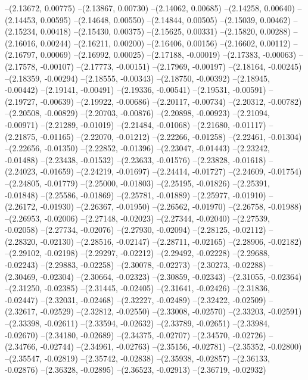 --(2.13672, 0.00775)
--(2.13867, 0.00730)
--(2.14062, 0.00685)
--(2.14258, 0.00640)
--(2.14453, 0.00595)
--(2.14648, 0.00550)
--(2.14844, 0.00505)
--(2.15039, 0.00462)
--(2.15234, 0.00418)
--(2.15430, 0.00375)
--(2.15625, 0.00331)
--(2.15820, 0.00288)
--(2.16016, 0.00244)
--(2.16211, 0.00200)
--(2.16406, 0.00156)
--(2.16602, 0.00112)
--(2.16797, 0.00069)
--(2.16992, 0.00025)
--(2.17188, -0.00019)
--(2.17383, -0.00063)
--(2.17578, -0.00107)
--(2.17773, -0.00151)
--(2.17969, -0.00197)
--(2.18164, -0.00245)
--(2.18359, -0.00294)
--(2.18555, -0.00343)
--(2.18750, -0.00392)
--(2.18945, -0.00442)
--(2.19141, -0.00491)
--(2.19336, -0.00541)
--(2.19531, -0.00591)
--(2.19727, -0.00639)
--(2.19922, -0.00686)
--(2.20117, -0.00734)
--(2.20312, -0.00782)
--(2.20508, -0.00829)
--(2.20703, -0.00876)
--(2.20898, -0.00923)
--(2.21094, -0.00971)
--(2.21289, -0.01019)
--(2.21484, -0.01068)
--(2.21680, -0.01117)
--(2.21875, -0.01165)
--(2.22070, -0.01212)
--(2.22266, -0.01258)
--(2.22461, -0.01304)
--(2.22656, -0.01350)
--(2.22852, -0.01396)
--(2.23047, -0.01443)
--(2.23242, -0.01488)
--(2.23438, -0.01532)
--(2.23633, -0.01576)
--(2.23828, -0.01618)
--(2.24023, -0.01659)
--(2.24219, -0.01697)
--(2.24414, -0.01727)
--(2.24609, -0.01754)
--(2.24805, -0.01779)
--(2.25000, -0.01803)
--(2.25195, -0.01826)
--(2.25391, -0.01848)
--(2.25586, -0.01869)
--(2.25781, -0.01889)
--(2.25977, -0.01910)
--(2.26172, -0.01930)
--(2.26367, -0.01950)
--(2.26562, -0.01970)
--(2.26758, -0.01988)
--(2.26953, -0.02006)
--(2.27148, -0.02023)
--(2.27344, -0.02040)
--(2.27539, -0.02058)
--(2.27734, -0.02076)
--(2.27930, -0.02094)
--(2.28125, -0.02112)
--(2.28320, -0.02130)
--(2.28516, -0.02147)
--(2.28711, -0.02165)
--(2.28906, -0.02182)
--(2.29102, -0.02198)
--(2.29297, -0.02212)
--(2.29492, -0.02228)
--(2.29688, -0.02243)
--(2.29883, -0.02258)
--(2.30078, -0.02273)
--(2.30273, -0.02288)
--(2.30469, -0.02304)
--(2.30664, -0.02323)
--(2.30859, -0.02343)
--(2.31055, -0.02364)
--(2.31250, -0.02385)
--(2.31445, -0.02405)
--(2.31641, -0.02426)
--(2.31836, -0.02447)
--(2.32031, -0.02468)
--(2.32227, -0.02489)
--(2.32422, -0.02509)
--(2.32617, -0.02529)
--(2.32812, -0.02550)
--(2.33008, -0.02570)
--(2.33203, -0.02591)
--(2.33398, -0.02611)
--(2.33594, -0.02632)
--(2.33789, -0.02651)
--(2.33984, -0.02670)
--(2.34180, -0.02689)
--(2.34375, -0.02707)
--(2.34570, -0.02726)
--(2.34766, -0.02744)
--(2.34961, -0.02763)
--(2.35156, -0.02781)
--(2.35352, -0.02800)
--(2.35547, -0.02819)
--(2.35742, -0.02838)
--(2.35938, -0.02857)
--(2.36133, -0.02876)
--(2.36328, -0.02895)
--(2.36523, -0.02913)
--(2.36719, -0.02932)
